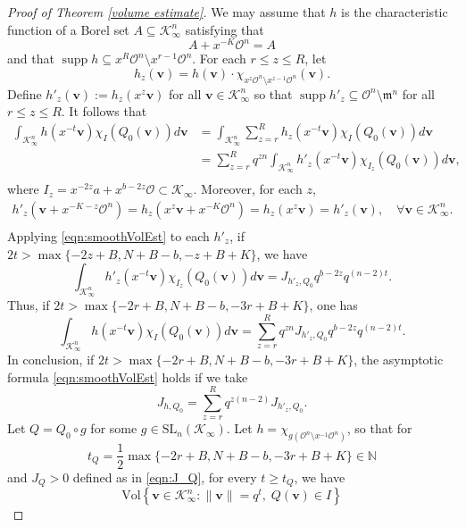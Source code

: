 \documentclass[11pt,a4paper,reqno]{amsart}
\def\vol{\mathrm{Vol}}
\newcommand{\SL}{\mathrm{SL}}
\theoremstyle{definition}
\theoremstyle{remark}
\numberwithin{equation}{section}
\DeclareMathOperator{\supp}{supp}
\begin{document}
\begin{proof}[Proof of Theorem \ref{volume estimate}]
We may assume that $h$ is the characteristic function of a Borel set $A\subseteq \mathcal K_\infty^n$ satisfying that
\[
A+ x^{-K}\mathcal O^n=A
\]
and that $\supp h\subseteq x^R\mathcal O^n\setminus x^{r-1}\mathcal O^n$.
For each $r\le z \le R$, let 
\[
h_z(\mathbf v)=h(\mathbf v)\cdot \chi^{}_{x^z\mathcal O^n\setminus x^{z-1}\mathcal O^n}(\mathbf v).
\]
Define $h'_z(\mathbf v):=h_z(x^{z}\mathbf v)$ for all $\mathbf v\in \mathcal K_\infty^n$ so that $\supp h'_z\subseteq \mathcal O^n\setminus \mathfrak{m}^n$ for all $r\le z\le R$.
It follows that
\[\begin{split}
\int_{\mathcal K_\infty^n} h(x^{-t}\mathbf v) \chi_I(Q_0(\mathbf v))d\mathbf v
&=\int_{\mathcal K_\infty^n} \sum_{z=r}^R h_z(x^{-t}\mathbf v) \chi_I (Q_0(\mathbf v)) d\mathbf v\\
&=\sum_{z=r}^R q^{zn}\int_{\mathcal K_\infty^n} h'_z(x^{-t}\mathbf v)\chi^{}_{I_z}(Q_0(\mathbf v)) d\mathbf v,\\
\end{split}\]
where $I_z=x^{-2z}a+x^{b-2z}\mathcal O\subset \mathcal K_\infty$. Moreover, for each $z$,
\[\begin{gathered}
h'_z(\mathbf v+x^{-K-z} \mathcal O^n)
=h_z(x^{z}\mathbf v + x^{-K}\mathcal O^n)
=h_z(x^{z}\mathbf v)
=h'_z(\mathbf v),\quad\forall \mathbf v\in \mathcal K^n_\infty.\\
\end{gathered}\]
Applying \eqref{eqn:smoothVolEst} to each $h'_z$, if $2t>\max\{-2z+B, N+B-b, -z+B+K\}$, we have
\[
\int_{\mathcal K_\infty^n} h'_z(x^{-t}\mathbf v) \chi^{}_{I_z}(Q_0(\mathbf v)) d\mathbf v
=J_{h'_z,Q_0}q^{b-2z}q^{(n-2)t}.
\]
Thus, if $2t>\max\{-2r+B, N+B-b,-3r+B+K\}$, one has
\[
\int_{\mathcal K_\infty^n} h(x^{-t}\mathbf v) \chi_I(Q_0(\mathbf v))d\mathbf v
=\sum_{z=r}^R q^{zn} J_{h'_z,Q_0}q^{b-2z}q^{(n-2)t}.
\]
In conclusion, if $2t>\max\{-2r+B, N+B-b,-3r+B+K\}$, the asymptotic formula \eqref{eqn:smoothVolEst} holds
if we take
\begin{equation}
\label{eqn:J_Q}
J_{h,Q_0}=\sum_{z=r}^R q^{z(n-2)}J_{h'_z,Q_0}.
\end{equation}
\vspace{0.1in}
Let $Q=Q_0\circ g$ for some $g\in \SL_n(\mathcal K_\infty)$. Let $h=\chi^{}_{g(\mathcal O^n\setminus x^{-1}\mathcal O^n)}$, so that for $$t_Q=\frac{1}{2}\max\{-2r+B,N+B-b,-3r+B+K\}\in \mathbb N$$ and $J_{Q}>0$ defined as in \eqref{eqn:J_Q}, for every $t\ge t_Q$, we have
\[
\vol\left\{\mathbf v\in \mathcal K_\infty^n: \|\mathbf v\|=q^t,\; Q(\mathbf v) \in I \right\}
\]
\end{proof}
\end{document}
